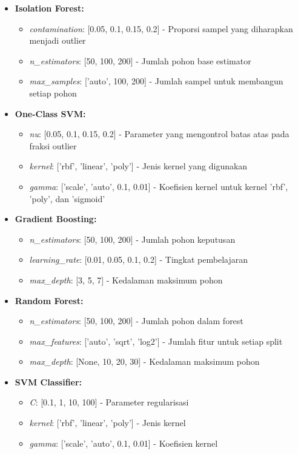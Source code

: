 \begin{itemize}
    \item \textbf{Isolation Forest:}
    \begin{itemize}
        \item \textit{contamination}: [0.05, 0.1, 0.15, 0.2] - Proporsi sampel yang diharapkan menjadi outlier
        \item \textit{n\_estimators}: [50, 100, 200] - Jumlah pohon base estimator
        \item \textit{max\_samples}: ['auto', 100, 200] - Jumlah sampel untuk membangun setiap pohon
    \end{itemize}
    
    \item \textbf{One-Class SVM:}
    \begin{itemize}
        \item \textit{nu}: [0.05, 0.1, 0.15, 0.2] - Parameter yang mengontrol batas atas pada fraksi outlier
        \item \textit{kernel}: ['rbf', 'linear', 'poly'] - Jenis kernel yang digunakan
        \item \textit{gamma}: ['scale', 'auto', 0.1, 0.01] - Koefisien kernel untuk kernel 'rbf', 'poly', dan 'sigmoid'
    \end{itemize}
    
    \item \textbf{Gradient Boosting:}
    \begin{itemize}
        \item \textit{n\_estimators}: [50, 100, 200] - Jumlah pohon keputusan
        \item \textit{learning\_rate}: [0.01, 0.05, 0.1, 0.2] - Tingkat pembelajaran
        \item \textit{max\_depth}: [3, 5, 7] - Kedalaman maksimum pohon
    \end{itemize}
    
    \item \textbf{Random Forest:}
    \begin{itemize}
        \item \textit{n\_estimators}: [50, 100, 200] - Jumlah pohon dalam forest
        \item \textit{max\_features}: ['auto', 'sqrt', 'log2'] - Jumlah fitur untuk setiap split
        \item \textit{max\_depth}: [None, 10, 20, 30] - Kedalaman maksimum pohon
    \end{itemize}
    
    \item \textbf{SVM Classifier:}
    \begin{itemize}
        \item \textit{C}: [0.1, 1, 10, 100] - Parameter regularisasi
        \item \textit{kernel}: ['rbf', 'linear', 'poly'] - Jenis kernel
        \item \textit{gamma}: ['scale', 'auto', 0.1, 0.01] - Koefisien kernel
    \end{itemize}
    

\end{itemize}
